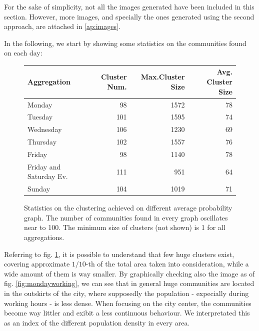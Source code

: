 \documentclass[12pt,a4paper]{article}
\begin{document}
For the sake of simplicity, not all the images generated have been included in this section. However, more images, and specially the ones generated using the second approach, are attached in \ref{ap:images}.

In the following, we start by showing some statistics on the communities found on each day:

\begin{figure}[H]
\centering
\begin{tabular}{| l | r | r | r |}
\hline
\textbf{Aggregation} & \textbf{Cluster Num.} & \textbf{Max.Cluster Size} & \textbf{Avg. Cluster Size} \\ \hline
Monday & 98 & 1572 & 78 \\ \hline
Tuesday & 101 & 1595 & 74 \\ \hline
Wednesday & 106 & 1230  & 69 \\ \hline
Thursday & 102 & 1557  & 76 \\ \hline
Friday &  98 & 1140 & 78 \\ \hline
Friday and Saturday Ev. & 111 & 951 & 64 \\ \hline
Sunday & 104 & 1019 & 71 \\ \hline
\end{tabular}
\caption{Statistics on the clustering achieved on different average probability graph. The number of communities found
in every graph oscillates near to 100. The minimum size of clusters (not shown) is 1 for all aggregations.}
\label{fig:foundClusters}
\end{figure}

Referring to fig. \ref{fig:foundClusters}, it is possible to understand that few huge clusters exist, covering approximate $1/10$-th of the total area taken into consideration, while a wide amount of them is way smaller.
By graphically checking also the image as of fig. \ref{fig:mondayworking}, we can see that in general huge communities are located in the outskirts of the city, where supposedly the population - expecially during working hours - is less dense. When focusing on the city center, the communities become way littler and exibit a less continuous behaviour. We interpretated this as an index of the different population density in every area.
\end{document}
